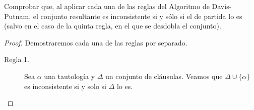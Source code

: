 \documentclass[12pt]{article}
\begin{document}
    
    \begin{ejercicio}\label{ej:2}
        Comprobar que, al aplicar cada una de las reglas del Algoritmo de Davis-Putnam, el conjunto resultante es inconsistente si y sólo si el de partida lo es (salvo en el caso de la quinta regla, en el que se desdobla el conjunto).
        \begin{proof}
            Demostraremos cada una de las reglas por separado.
            \begin{description}
                \item[Regla 1.] Sea $\alpha$ una tautología y $\Delta$ un conjunto de cláusulas.
                Veamos que $\Delta\cup \{\alpha\}$ es inconsistente si y solo si $\Delta$ lo es.
            \end{description}
        \end{proof}
    \end{ejercicio}
\end{document}
